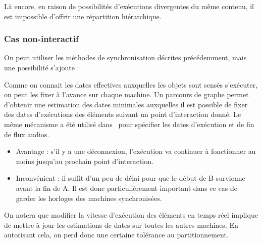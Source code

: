 \documentclass{article}
\newcommand\trigger{point d'interaction\xspace}
\begin{document}
\begin{itemize}
    Là encore, en raison de possibilités d'exécutions divergentes du même contenu, il est impossible d'offrir une répartition hiérarchique.
    
    \begin{figure}[h]
        \centering
        \begin{tikzpicture}
        
        \end{tikzpicture}
        \label{scenar.twobranches}
    \end{figure}
    
\end{itemize}



\subsubsection{Cas non-interactif}
On peut utiliser les méthodes de synchronisation décrites précédemment, mais une possibilité s'ajoute : 

Comme on connait les dates effectives auxquelles les objets sont sensés s'exécuter, on peut les fixer à l'avance sur chaque machine. 
Un parcours de graphe permet d'obtenir une estimation des dates minimales auxquelles il est possible de fixer des dates d'exécutions des éléments suivant un point d'interaction donné.
Le même mécanisme a été utilisé dans~\cite{celerier2016rethinking} pour spécifier les dates d'exécution et de fin de flux audios.


\begin{itemize}
\item Avantage : s'il y a une déconnexion, l'exécution va continuer à fonctionner au moins jusqu'au prochain \trigger.
\item Inconvénient : il suffit d'un peu de délai pour que le début de B survienne avant la fin de A. 
Il est donc particulièrement important dans ce cas de garder les horloges des machines synchronisées.
\end{itemize}

On notera que modifier la vitesse d'exécution des éléments en temps réel implique de mettre à jour les estimations de dates sur toutes les autres machines. 
En autorisant cela, on perd donc une certaine tolérance au partitionnement.

\begin{figure}[h]
	\centering
	\begin{tikzpicture}
	
	\end{tikzpicture}
	\label{scenar.non-interactif}
\end{figure}
\end{document}
